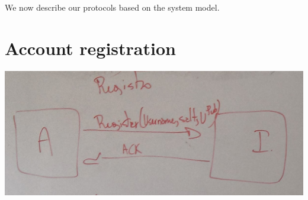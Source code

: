 

We now describe our protocols based on the system model. 

\section{Account registration}
\includegraphics[width=14cm]{../img/registration_protocol_mockup.png}\\

